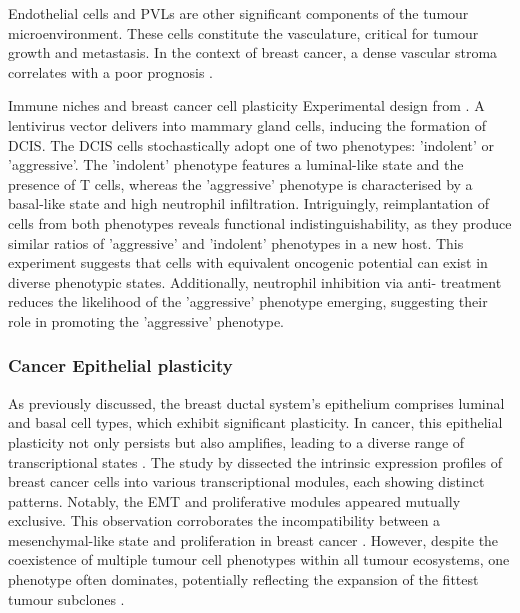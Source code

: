 Endothelial cells and \acp{PVL} are other significant components of the tumour microenvironment. These cells constitute the vasculature, critical for tumour growth and metastasis. In the context of breast cancer, a dense vascular stroma correlates with a poor prognosis \parencite{Danenberg2022-zb}.

    {Immune niches and breast cancer cell plasticity}
    {Experimental design from \textcite{Sinha2021-mf}. A lentivirus vector delivers  into mammary gland cells, inducing the formation of \acf{DCIS}. The \ac{DCIS} cells stochastically adopt one of two phenotypes: 'indolent' or 'aggressive'. The 'indolent' phenotype features a luminal-like state and the presence of T cells, whereas the 'aggressive' phenotype is characterised by a basal-like state and high neutrophil infiltration. Intriguingly, reimplantation of cells from both phenotypes reveals functional indistinguishability, as they produce similar ratios of 'aggressive' and 'indolent' phenotypes in a new host. This experiment suggests that cells with equivalent oncogenic potential can exist in diverse phenotypic states. Additionally, neutrophil inhibition via anti- treatment reduces the likelihood of the 'aggressive' phenotype emerging, suggesting their role in promoting the 'aggressive' phenotype.}


\subsubsection*{Cancer Epithelial plasticity}

As previously discussed, the breast ductal system's epithelium comprises luminal and basal cell types, which exhibit significant plasticity. In cancer, this epithelial plasticity not only persists but also amplifies, leading to a diverse range of transcriptional states \parencite{Wagner2019-zp, Wu2021-uq, Pal2021-rf}. The study by \textcite{Wu2021-uq} dissected the intrinsic expression profiles of breast cancer cells into various transcriptional modules, each showing distinct patterns. Notably, the \acf{EMT} and proliferative modules appeared mutually exclusive. This observation corroborates the incompatibility between a mesenchymal-like state and proliferation in breast cancer \parencite{Tsai2012-hb}. However, despite the coexistence of multiple tumour cell phenotypes within all tumour ecosystems, one phenotype often dominates, potentially reflecting the expansion of the fittest tumour subclones \parencite{Wagner2019-zp}.

